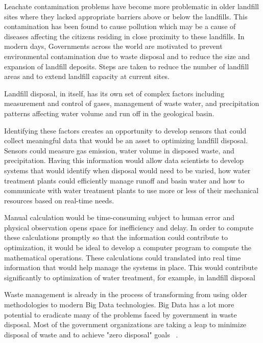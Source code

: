 \documentclass[sigconf]{acmart}
\begin{document}
Leachate contamination problems have become more problematic in older landfill sites where they lacked appropriate barriers above or below the landfills.  This contamination has been found to cause pollution which may be a cause of  diseases affecting the citizens residing in close proximity to these landfills. In modern days, Governments across the world are motivated to prevent environmental contamination due to waste disposal and to reduce the size and expansion of landfill deposits. Steps are taken to reduce the number of landfill areas and to extend landfill capacity at current sites. 

Landfill disposal, in itself, has its own set of complex factors including measurement and control of gases, management of waste water, and precipitation patterns affecting water volume and run off  in the geological basin.  

Identifying these factors creates an opportunity to develop sensors that could collect meaningful data that would be an asset to optimizing landfill disposal.  Sensors could measure gas emission, water volume in disposed waste, and precipitation.  Having this information would allow data scientists to develop systems that would identify when disposal would need to be varied, how water treatment plants could efficiently manage runoff and basin water and how to communicate with water treatment plants to use more or less of their mechanical resources based on real-time needs. 

Manual calculation would be time-consuming subject to human error and physical observation opens space for inefficiency and delay.  In order to compute these calculations promptly so that the information could contribute to optimization, it would be ideal to develop a computer program to compute the mathematical operations.  These calculations could translated into real time information that would help manage the systems in place.  This would contribute significantly to optimization of water treatment, for example, in landfill disposal ~\cite{akbarpour2016}

Waste management is already in the process of transforming from using older methodologies to modern Big Data technologies. Big Data has a lot more potential to eradicate many of the problems faced by government in waste disposal. Most of the government organizations are taking a leap to minimize disposal of waste and to achieve "zero disposal" goals~\cite{rosengren2017} . 
\end{document}
